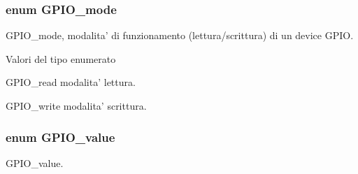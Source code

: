 \hypertarget{group___g_p_i_o_ga894e6ae857ed4a9aedd04fff44a6770e}{
\subsubsection[{G\+P\+I\+O\+\_\+mode}]{\setlength{\rightskip}{0pt plus 5cm}enum {\bf G\+P\+I\+O\+\_\+mode}}}\label{group___g_p_i_o_ga894e6ae857ed4a9aedd04fff44a6770e}


G\+P\+I\+O\+\_\+mode, modalita' di funzionamento (lettura/scrittura) di un device G\+P\+I\+O. 

\begin{Desc}
\item[Valori del tipo enumerato]\par
\begin{description}
\item[{\em 
\hypertarget{group___g_p_i_o_gga894e6ae857ed4a9aedd04fff44a6770ea3db3c7d228d9b87cc125c8974241c800}{G\+P\+I\+O\+\_\+read}\label{group___g_p_i_o_gga894e6ae857ed4a9aedd04fff44a6770ea3db3c7d228d9b87cc125c8974241c800}
}]G\+P\+I\+O\+\_\+read modalita' lettura. \item[{\em 
\hypertarget{group___g_p_i_o_gga894e6ae857ed4a9aedd04fff44a6770eab1b932c1d800b09eb45b7ff5750bf73c}{G\+P\+I\+O\+\_\+write}\label{group___g_p_i_o_gga894e6ae857ed4a9aedd04fff44a6770eab1b932c1d800b09eb45b7ff5750bf73c}
}]G\+P\+I\+O\+\_\+write modalita' scrittura. \end{description}
\end{Desc}
\hypertarget{group___g_p_i_o_ga495d9a7aa735fe416a3f110337c54967}{
\subsubsection[{G\+P\+I\+O\+\_\+value}]{\setlength{\rightskip}{0pt plus 5cm}enum {\bf G\+P\+I\+O\+\_\+value}}}\label{group___g_p_i_o_ga495d9a7aa735fe416a3f110337c54967}


G\+P\+I\+O\+\_\+value. 

